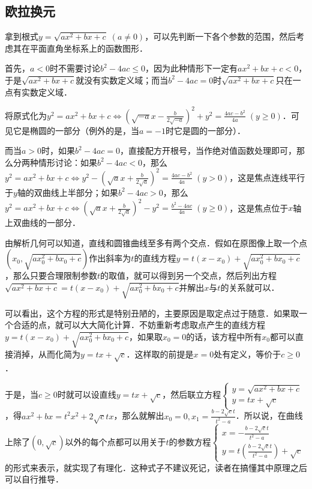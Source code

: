 \documentclass{ctexbook}
\begin{document}
\subsection{欧拉换元}
拿到根式$y=\sqrt{ax^{2}+bx+c}\;\left(a\ne0\right)$，可以先判断一下各个参数的范围，然后考虑其在平面直角坐标系上的函数图形．\par
首先，$a<0$时不需要讨论$b^{2}-4ac\le0$，因为此种情形下一定有$ax^{2}+bx+c<0$，于是$\sqrt{ax^{2}+bx+c}$就没有实数定义域；而当$b^{2}-4ac=0$时$\sqrt{ax^{2}+bx+c}$只在一点有实数定义域．\par
将原式化为$y^{2}=ax^{2}+bx+c\Leftrightarrow\left(\sqrt{-a}x-\frac{b}{2\sqrt{-a}}\right)^{2}+y^{2}=\frac{4ac-b^{2}}{4a}\;\left(y\ge0\right)$．可见它是椭圆的一部分（例外的是，当$a=-1$时它是圆的一部分）．\par
而当$a>0$时，如果$b^{2}-4ac=0$，直接配方开根号，当作绝对值函数处理即可，那么分两种情形讨论：如果$b^{2}-4ac<0$，那么$y^{2}=ax^{2}+bx+c\Leftrightarrow y^{2}-\left(\sqrt{a}x+\frac{b}{2\sqrt{a}}\right)^{2}=\frac{4ac-b^{2}}{4a}\;\left(y>0\right)$，这是焦点连线平行于$y$轴的双曲线上半部分；如果$b^{2}-4ac>0$，那么$y^{2}=ax^{2}+bx+c\Leftrightarrow\left(\sqrt{a}x+\frac{b}{2\sqrt{a}}\right)^{2}-y^{2}=\frac{b^{2}-4ac}{4a}\;\left(y\ge0\right)$，这是焦点位于$x$轴上双曲线的一部分．\par
由解析几何可以知道，直线和圆锥曲线至多有两个交点．假如在原图像上取一个点$\left(x_{0},\sqrt{ax_{0}^{2}+bx_{0}+c}\right)$作出斜率为$t$的直线方程$y=t\left(x-x_{0}\right)+\sqrt{ax_{0}^{2}+bx_{0}+c}$，那么只要合理限制参数$t$的取值，就可以得到另一个交点，然后列出方程$\sqrt{ax^{2}+bx+c}=t\left(x-x_{0}\right)+\sqrt{ax_{0}^{2}+bx_{0}+c}$并解出$x$与$t$的关系就可以．\par
可以看出，这个方程的形式是特别丑陋的，主要原因是取定点过于随意．如果取一个合适的点，就可以大大简化计算．不妨重新考虑取点产生的直线方程$y=t\left(x-x_{0}\right)+\sqrt{ax_{0}^{2}+bx_{0}+c}$，如果取$x_{0}=0$的话，该方程中所有$x_{0}$都可以直接消掉，从而化简为$y=tx+\sqrt{c}$．这样取的前提是$x=0$处有定义，等价于$c\ge0$．\par
于是，当$c\ge0$时就可以设直线$y=tx+\sqrt{c}$，然后联立方程$\begin{cases}y=\sqrt{ax^{2}+bx+c}\\y=tx+\sqrt{c}\end{cases}$，得$ax^{2}+bx=t^{2}x^{2}+2\sqrt{c}tx$，那么就解出$x_{0}=0,x_{1}=\frac{b-2\sqrt{c}t}{t^{2}-a}$．所以说，在曲线上除了$\left(0,\sqrt{c}\right)$以外的每个点都可以用关于$t$的参数方程$\begin{cases}x=-\frac{b-2\sqrt{c}t}{t^{2}-a}\\y=t\left(\frac{b-2\sqrt{c}t}{t^{2}-a}\right)+\sqrt{c}\end{cases}$的形式来表示，就实现了有理化．这种式子不建议死记，读者在搞懂其中原理之后可以自行推导．\par
\end{document}
